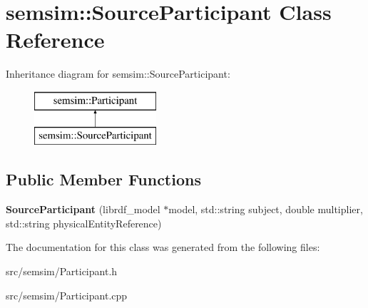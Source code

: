 \hypertarget{classsemsim_1_1SourceParticipant}{}\section{semsim\+:\+:Source\+Participant Class Reference}
\label{classsemsim_1_1SourceParticipant}
Inheritance diagram for semsim\+:\+:Source\+Participant\+:\begin{figure}[H]
\begin{center}
\leavevmode
\includegraphics[height=2.000000cm]{classsemsim_1_1SourceParticipant}
\end{center}
\end{figure}
\subsection*{Public Member Functions}
\begin{DoxyCompactItemize}
\item 
\mbox{\label{classsemsim_1_1SourceParticipant_a7e942f26b1bf916f0441d353f80833a1}} 
{\bfseries Source\+Participant} (librdf\+\_\+model $\ast$model, std\+::string subject, double multiplier, std\+::string physical\+Entity\+Reference)
\end{DoxyCompactItemize}


The documentation for this class was generated from the following files\+:\begin{DoxyCompactItemize}
\item 
src/semsim/Participant.\+h\item 
src/semsim/Participant.\+cpp\end{DoxyCompactItemize}
